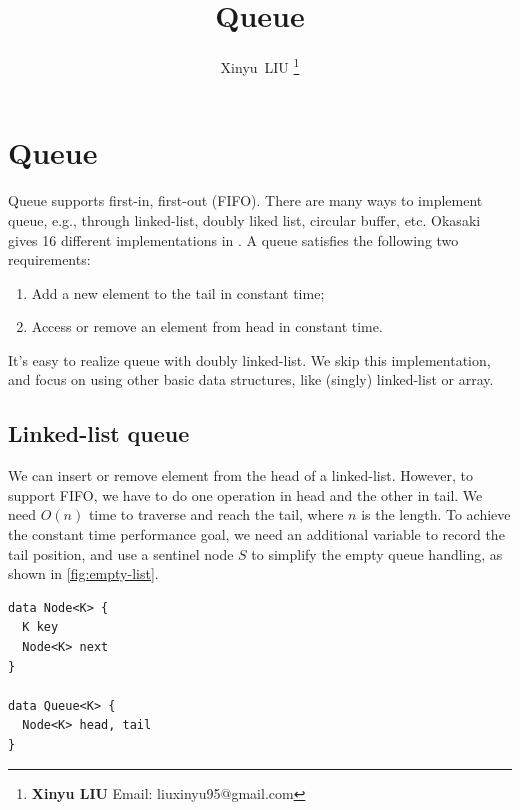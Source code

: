 \documentclass[b5paper]{article}
\begin{document}
\title{Queue}

\author{Xinyu~LIU
\thanks{{\bfseries Xinyu LIU} \newline
  Email: liuxinyu95@gmail.com \newline}
  }

\maketitle
\fi


\ifx\wholebook\relax
\chapter{Queue}
\fi

Queue supports first-in, first-out (FIFO). There are many ways to implement queue, e.g., through linked-list, doubly liked list, circular buffer, etc. Okasaki gives 16 different implementations in \cite{okasaki-book}. A queue satisfies the following two requirements:

\begin{enumerate}
\item Add a new element to the tail in constant time;
\item Access or remove an element from head in constant time.
\end{enumerate}

It's easy to realize queue with doubly linked-list. We skip this implementation, and focus on using other basic data structures, like (singly) linked-list or array.

\section{Linked-list queue}

We can insert or remove element from the head of a linked-list. However, to support FIFO, we have to do one operation in head and the other in tail. We need $O(n)$ time to traverse and reach the tail, where $n$ is the length. To achieve the constant time performance goal, we need an additional variable to record the tail position, and use a sentinel node $S$ to simplify the empty queue handling, as shown in \cref{fig:empty-list}.

\lstset{frame = single}
\begin{lstlisting}[language = Bourbaki]
data Node<K> {
  K key
  Node<K> next
}

data Queue<K> {
  Node<K> head, tail
}
\end{lstlisting}
\end{document}
